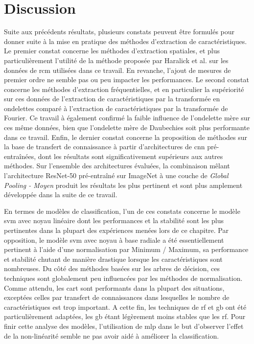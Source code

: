 \section{Discussion}
Suite aux précédents résultats, plusieurs constats peuvent être formulés pour donner suite à la mise en pratique des méthodes d'extraction de caractéristiques. Le premier constat concerne les méthodes d'extraction spatiales, et plus particulièrement l'utilité de la méthode proposée par Haralick et al. sur les données de \gls{rcm} utilisées dans ce travail. En revanche, l'ajout de mesures de premier ordre ne semble pas ou peu impacter les performances. Le second constat concerne les méthodes d'extraction fréquentielles, et en particulier la supériorité sur ces données de l'extraction de caractéristiques par la transformée en ondelettes comparé à l'extraction de caractéristiques par la transformée de Fourier. Ce travail à également confirmé la faible influence de l'ondelette mère sur ces même données, bien que l'ondelette mère de Daubechies soit plus performante dans ce travail. Enfin, le dernier constat concerne la proposition de méthodes sur la base de transfert de connaissance à partir d'architectures de \gls{cnn} pré-entraînées, dont les résultats sont significativement supérieurs aux autres méthodes. Sur l'ensemble des architectures évaluées, la combinaison mêlant l'architecture ResNet-50 pré-entraîné sur ImageNet à une couche de \textit{Global Pooling - Moyen} produit les résultats les plus pertinent et sont plus amplement développée dans la suite de ce travail.\par

En termes de modèles de classification, l'un de ces constats concerne le modèle \gls{svm} avec noyau linéaire dont les performances et la stabilité sont les plus pertinentes dans la plupart des expériences menées lors de ce chapitre. Par opposition, le modèle \gls{svm} avec noyau à base radiale a été essentiellement pertinent à l'aide d'une normalisation par Minimum / Maximum, sa performance et stabilité chutant de manière drastique lorsque les caractéristiques sont nombreuses. Du côté des méthodes basées sur les arbres de décision, ces techniques sont globalement peu influencées par les méthodes de normalisation. Comme attendu, les \gls{cart} sont performants dans la plupart des situations, exceptées celles par transfert de connaissances dans lesquelles le nombre de caractéristiques est trop important. A cette fin, les techniques de \gls{rf} et \gls{gb} ont été particulièrement adaptées, les \gls{gb} étant légèrement moins stables que les \gls{rf}. Pour finir cette analyse des modèles, l'utilisation de \gls{mlp} dans le but d'observer l'effet de la non-linéarité semble ne pas avoir aidé à améliorer la classification.\par


